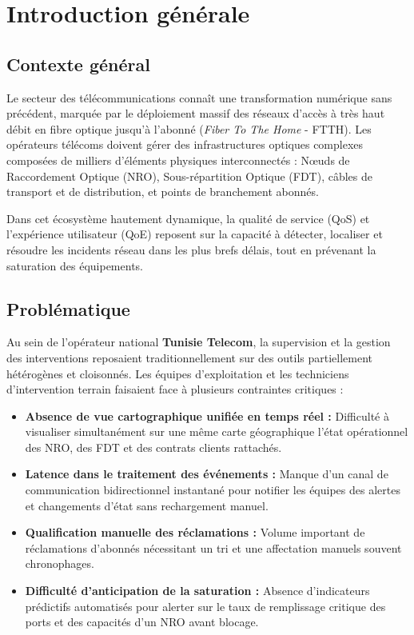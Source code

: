 \chapter*{Introduction g\'en\'erale}

\section*{Contexte g\'en\'eral}
Le secteur des t\'el\'ecommunications conna\^it une transformation num\'erique sans pr\'ec\'edent, marqu\'ee par le d\'eploiement massif des r\'eseaux d'acc\`es \`a tr\`es haut d\'ebit en fibre optique jusqu'\`a l'abonn\'e (\textit{Fiber To The Home} - FTTH). Les op\'erateurs t\'el\'ecoms doivent g\'erer des infrastructures optiques complexes compos\'ees de milliers d'\'el\'ements physiques interconnect\'es : N\oe uds de Raccordement Optique (NRO), Sous-r\'epartition Optique (FDT), c\^ables de transport et de distribution, et points de branchement abonn\'es.

Dans cet \'ecosyst\`eme hautement dynamique, la qualit\'e de service (QoS) et l'exp\'erience utilisateur (QoE) reposent sur la capacit\'e \`a d\'etecter, localiser et r\'esoudre les incidents r\'eseau dans les plus brefs d\'elais, tout en pr\'evenant la saturation des \'equipements.

\section*{Probl\'ematique}
Au sein de l'op\'erateur national \textbf{Tunisie Telecom}, la supervision et la gestion des interventions reposaient traditionnellement sur des outils partiellement h\'et\'erog\`enes et cloisonn\'es. Les \'equipes d'exploitation et les techniciens d'intervention terrain faisaient face \`a plusieurs contraintes critiques :
\begin{itemize}
    \item \textbf{Absence de vue cartographique unifi\'ee en temps r\'eel :} Difficult\'e \`a visualiser simultan\'ement sur une m\^eme carte g\'eographique l'\'etat op\'erationnel des NRO, des FDT et des contrats clients rattach\'es.
    \item \textbf{Latence dans le traitement des \'ev\'enements :} Manque d'un canal de communication bidirectionnel instantan\'e pour notifier les \'equipes des alertes et changements d'\'etat sans rechargement manuel.
    \item \textbf{Qualification manuelle des r\'eclamations :} Volume important de r\'eclamations d'abonn\'es n\'ecessitant un tri et une affectation manuels souvent chronophages.
    \item \textbf{Difficult\'e d'anticipation de la saturation :} Absence d'indicateurs pr\'edictifs automatis\'es pour alerter sur le taux de remplissage critique des ports et des capacit\'es d'un NRO avant blocage.
\end{itemize}

